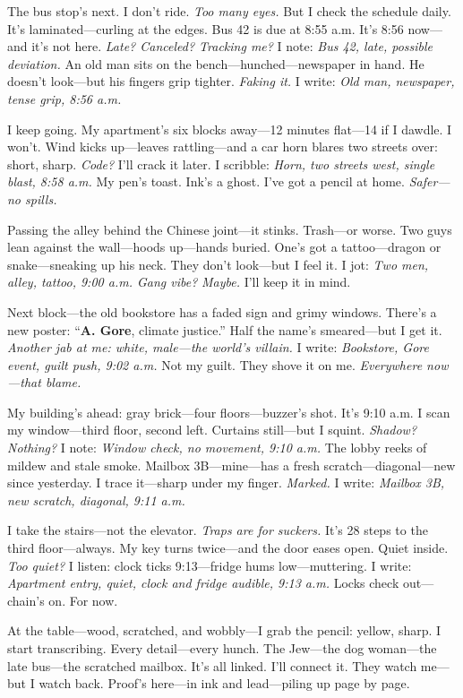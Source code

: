 \documentclass{article}
\begin{document}
The bus stop’s next. I don’t ride. \textit{Too many eyes.} But I check the schedule daily. It’s laminated—curling at the edges. Bus 42 is due at 8:55 a.m. It’s 8:56 now—and it’s not here. \textit{Late? Canceled? Tracking me?} I note: \textit{Bus 42, late, possible deviation.} An old man sits on the bench—hunched—newspaper in hand. He doesn’t look—but his fingers grip tighter. \textit{Faking it.} I write: \textit{Old man, newspaper, tense grip, 8:56 a.m.}

I keep going. My apartment’s six blocks away—12 minutes flat—14 if I dawdle. I won’t. Wind kicks up—leaves rattling—and a car horn blares two streets over: short, sharp. \textit{Code?} I’ll crack it later. I scribble: \textit{Horn, two streets west, single blast, 8:58 a.m.} My pen’s toast. Ink’s a ghost. I’ve got a pencil at home. \textit{Safer—no spills.}

Passing the alley behind the Chinese joint—it stinks. Trash—or worse. Two guys lean against the wall—hoods up—hands buried. One’s got a tattoo—dragon or snake—sneaking up his neck. They don’t look—but I feel it. I jot: \textit{Two men, alley, tattoo, 9:00 a.m. Gang vibe?} \textit{Maybe.} I’ll keep it in mind.

Next block—the old bookstore has a faded sign and grimy windows. There’s a new poster: “\textbf{A. Gore}, climate justice.” Half the name’s smeared—but I get it. \textit{Another jab at me: white, male—the world’s villain.} I write: \textit{Bookstore, Gore event, guilt push, 9:02 a.m.} Not my guilt. They shove it on me. \textit{Everywhere now—that blame.}

My building’s ahead: gray brick—four floors—buzzer’s shot. It’s 9:10 a.m. I scan my window—third floor, second left. Curtains still—but I squint. \textit{Shadow? Nothing?} I note: \textit{Window check, no movement, 9:10 a.m.} The lobby reeks of mildew and stale smoke. Mailbox 3B—mine—has a fresh scratch—diagonal—new since yesterday. I trace it—sharp under my finger. \textit{Marked.} I write: \textit{Mailbox 3B, new scratch, diagonal, 9:11 a.m.}

I take the stairs—not the elevator. \textit{Traps are for suckers.} It’s 28 steps to the third floor—always. My key turns twice—and the door eases open. Quiet inside. \textit{Too quiet?} I listen: clock ticks 9:13—fridge hums low—muttering. I write: \textit{Apartment entry, quiet, clock and fridge audible, 9:13 a.m.} Locks check out—chain’s on. For now.

At the table—wood, scratched, and wobbly—I grab the pencil: yellow, sharp. I start transcribing. Every detail—every hunch. The Jew—the dog woman—the late bus—the scratched mailbox. It’s all linked. I’ll connect it. They watch me—but I watch back. Proof’s here—in ink and lead—piling up page by page.
\end{document}
